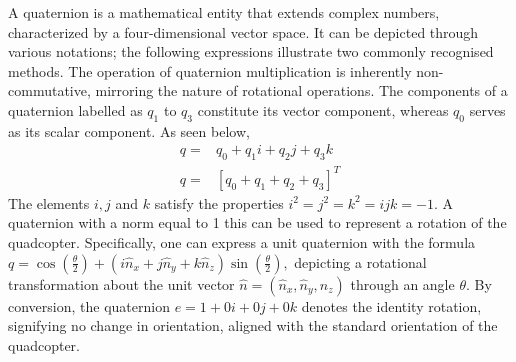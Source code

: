 \documentclass{report}
\begin{document}
A quaternion is a mathematical entity that extends complex numbers,
characterized by a four-dimensional vector space. It can be depicted through
various notations; the following expressions illustrate two commonly recognised
methods. The operation of quaternion multiplication is inherently
non-commutative, mirroring the nature of rotational operations. The components
of a quaternion labelled as \( q_1 \) to \( q_3 \) constitute its vector
component, whereas \( q_0 \) serves as its scalar component. As seen below,
\begin{align}
  q =& q_0 + {q_1}i + {q_2}j + {q_3}k \\
  q =& [q_0 + q_1 + q_2 + q_3]^T
\end{align}
The elements \(i , j\) and \(k\) satisfy the properties \( i^2 = j^2 = k^2 = ijk
= -1 \). A quaternion with a norm equal to 1 this can be used to represent a
rotation of the quadcopter. Specifically, one can express a unit quaternion with
the formula \( q = \cos \left(\frac{\theta}{2}\right) + \left(i\hat{n}_x +
j\hat{n}_y + k\hat{n}_z\right) \sin \left(\frac{\theta}{2}\right), \) depicting
a rotational transformation about the unit vector \(\hat{n} = (\hat{n}_x, \hat{n}_y, \hat{n}_z)\)
through an angle \( \theta \). By conversion, the quaternion \(e = 1 + 0i + 0j +
0k \) denotes the identity rotation, signifying no change in orientation,
aligned with the standard orientation of the quadcopter.
\end{document}
